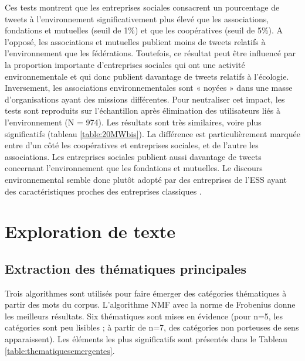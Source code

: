         Ces tests montrent que les entreprises sociales consacrent un pourcentage de tweets à l’environnement significativement plus élevé que les associations, fondations et mutuelles (seuil de 1\%) et que les coopératives (seuil de 5\%). A l’opposé, les associations et mutuelles publient moins de tweets relatifs à l’environnement que les fédérations. Toutefois, ce résultat peut être influencé par la proportion importante d’entreprises sociales qui ont une activité environnementale et qui donc publient davantage de tweets relatifs à l’écologie. Inversement, les associations environnementales sont « noyées » dans une masse d’organisations ayant des missions différentes. Pour neutraliser cet impact, les tests sont reproduits sur l’échantillon après élimination des utilisateurs liés à l’environnement (N = 974). Les résultats sont très similaires, voire plus significatifs (tableau \ref{table:20MWbis}). La différence est particulièrement marquée entre d’un côté les coopératives et entreprises sociales, et de l’autre les associations. Les entreprises sociales publient aussi davantage de tweets concernant l’environnement que les fondations et mutuelles. Le discours environnemental semble donc plutôt adopté par des entreprises de l’ESS ayant des caractéristiques proches des entreprises classiques .

\section{Exploration de texte}
    \subsection{Extraction des thématiques principales}
        Trois algorithmes sont utilisés pour faire émerger des catégories thématiques à partir des mots du corpus. L’algorithme NMF avec la norme de Frobenius donne les meilleurs résultats. Six thématiques sont mises en évidence (pour n=5, les catégories sont peu lisibles ; à partir de n=7, des catégories non porteuses de sens apparaissent). Les éléments les plus significatifs sont présentés dans le Tableau \ref{table:thematiquesemergentes}.

